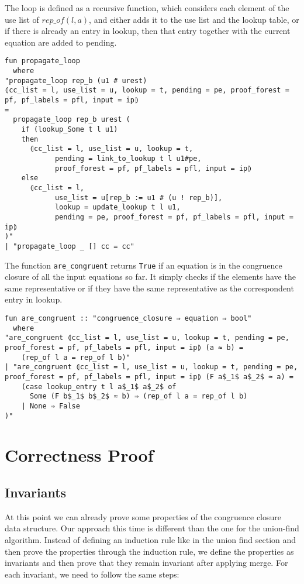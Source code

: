 The loop is defined as a recursive function, which considers each element of the use list of $rep\_of(l, a)$, and either adds it to the use list and the lookup table, or if there is already an entry in lookup, then that entry together with the current equation are added to pending.

\begin{lstlisting}
fun propagate_loop
  where
"propagate_loop rep_b (u1 # urest)
⦇cc_list = l, use_list = u, lookup = t, pending = pe, proof_forest = pf, pf_labels = pfl, input = ip⦈
=
  propagate_loop rep_b urest (
    if (lookup_Some t l u1)
    then
      ⦇cc_list = l, use_list = u, lookup = t,
            pending = link_to_lookup t l u1#pe,
            proof_forest = pf, pf_labels = pfl, input = ip⦈
    else
      ⦇cc_list = l,
            use_list = u[rep_b := u1 # (u ! rep_b)],
            lookup = update_lookup t l u1,
            pending = pe, proof_forest = pf, pf_labels = pfl, input = ip⦈
)"
| "propagate_loop _ [] cc = cc"
\end{lstlisting}

The function \lstinline{are_congruent} returns \lstinline{True} if an equation is in the congruence closure of all the input equations so far. It simply checks if the elements have the same representative or if they have the same representative as the correspondent entry in lookup.

\begin{lstlisting}
fun are_congruent :: "congruence_closure ⇒ equation ⇒ bool"
  where
"are_congruent ⦇cc_list = l, use_list = u, lookup = t, pending = pe, proof_forest = pf, pf_labels = pfl, input = ip⦈ (a ≈ b) =
    (rep_of l a = rep_of l b)"
| "are_congruent ⦇cc_list = l, use_list = u, lookup = t, pending = pe, proof_forest = pf, pf_labels = pfl, input = ip⦈ (F a$_1$ a$_2$ ≈ a) =
    (case lookup_entry t l a$_1$ a$_2$ of
      Some (F b$_1$ b$_2$ ≈ b) ⇒ (rep_of l a = rep_of l b)
    | None ⇒ False
)"
\end{lstlisting}

\section{Correctness Proof}

\subsection{Invariants}

At this point we can already prove some properties of the congruence closure data structure. Our approach this time is different than the one for the union-find algorithm. Instead of defining an induction rule like in the union find section and then prove the properties through the induction rule, we define the properties as invariants and then prove that they remain invariant after applying merge. For each invariant, we need to follow the same steps:

